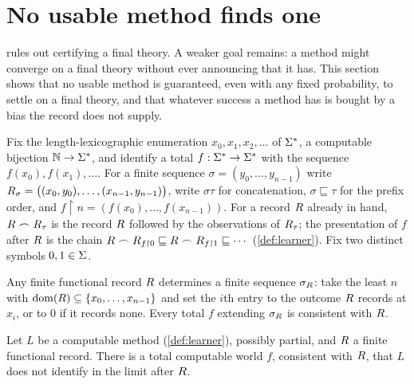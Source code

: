 \section{No usable method finds one}\label{sec:discover}

 rules out certifying a final theory. A weaker goal remains: a
method might converge on a final theory without ever announcing that it has. This
section shows that no usable method is guaranteed, even with any fixed probability, to
settle on a final theory, and that whatever success a method has is bought by a bias
the record does not supply.

Fix the length-lexicographic enumeration $x_0,x_1,x_2,\dots$ of $\Sigma^{*}$, a computable
bijection $\mathbb{N}\to\Sigma^{*}$, and identify a total $f:\Sigma^{*}\to\Sigma^{*}$ with the sequence
$f(x_0),f(x_1),\dots$. For a finite sequence $\sigma=(y_0,\dots,y_{n-1})$ write
$R_\sigma=\big((x_0,y_0),\dots,(x_{n-1},y_{n-1})\big)$, write $\sigma\tau$ for
concatenation, $\sigma\sqsubseteq\tau$ for the prefix order, and
$f\restriction n=(f(x_0),\dots,f(x_{n-1}))$. For a record $R$ already in hand,
$R\frown R_\tau$ is the record $R$ followed by the observations of $R_\tau$;
the presentation of $f$ after $R$ is the chain
$R\frown R_{f\restriction 0}\sqsubseteq R\frown R_{f\restriction 1}
\sqsubseteq\cdots$ (\cref{def:learner}). Fix two distinct symbols $0,1\in\Sigma$.

Any finite functional record $R$ determines a finite sequence $\sigma_R$: take
the least $n$ with $\operatorname{dom}(R)\subseteq\{x_0,\dots,x_{n-1}\}$ and set the $i$th entry to
the outcome $R$ records at $x_i$, or to $0$ if it records none. Every total $f$
extending $\sigma_R$ is consistent with $R$.

\begin{theorem}\label{thm:ud-gold}
Let $L$ be a computable method (\cref{def:learner}), possibly partial, and $R$ a
finite functional record. There is a total computable world $f$,
consistent with $R$, that $L$ does not identify in the limit after $R$.
\end{theorem}

